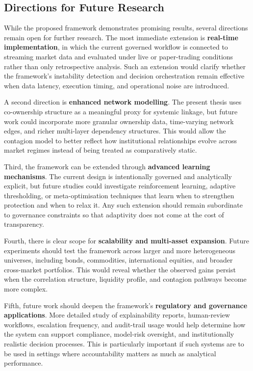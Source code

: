 \documentclass[11pt]{article}
\begin{document}
\subsection{Directions for Future Research}
While the proposed framework demonstrates promising results, several directions remain open for further research. The most immediate extension is \textbf{real-time implementation}, in which the current governed workflow is connected to streaming market data and evaluated under live or paper-trading conditions rather than only retrospective analysis. Such an extension would clarify whether the framework's instability detection and decision orchestration remain effective when data latency, execution timing, and operational noise are introduced.

A second direction is \textbf{enhanced network modelling}. The present thesis uses co-ownership structure as a meaningful proxy for systemic linkage, but future work could incorporate more granular ownership data, time-varying network edges, and richer multi-layer dependency structures. This would allow the contagion model to better reflect how institutional relationships evolve across market regimes instead of being treated as comparatively static.

Third, the framework can be extended through \textbf{advanced learning mechanisms}. The current design is intentionally governed and analytically explicit, but future studies could investigate reinforcement learning, adaptive thresholding, or meta-optimisation techniques that learn when to strengthen protection and when to relax it. Any such extension should remain subordinate to governance constraints so that adaptivity does not come at the cost of transparency.

Fourth, there is clear scope for \textbf{scalability and multi-asset expansion}. Future experiments should test the framework across larger and more heterogeneous universes, including bonds, commodities, international equities, and broader cross-market portfolios. This would reveal whether the observed gains persist when the correlation structure, liquidity profile, and contagion pathways become more complex.

Fifth, future work should deepen the framework's \textbf{regulatory and governance applications}. More detailed study of explainability reports, human-review workflows, escalation frequency, and audit-trail usage would help determine how the system can support compliance, model-risk oversight, and institutionally realistic decision processes. This is particularly important if such systems are to be used in settings where accountability matters as much as analytical performance.
\end{document}
